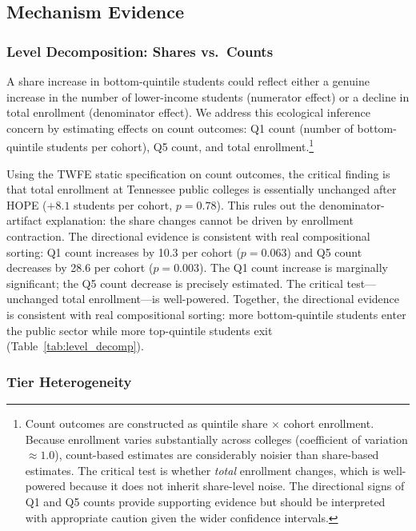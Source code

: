 \subsection{Mechanism Evidence}
\label{sec:results_mechanisms}

\subsubsection{Level Decomposition: Shares vs.\ Counts}

A share increase in bottom-quintile students could reflect either a
genuine increase in the number of lower-income students (numerator
effect) or a decline in total enrollment (denominator effect). We
address this ecological inference concern by estimating effects on
count outcomes: Q1 count (number of bottom-quintile students per
cohort), Q5 count, and total enrollment.\footnote{Count outcomes are
constructed as quintile share $\times$ cohort enrollment. Because
enrollment varies substantially across colleges (coefficient of
variation $\approx 1.0$), count-based estimates are considerably
noisier than share-based estimates. The critical test is whether
\emph{total} enrollment changes, which is well-powered because it does
not inherit share-level noise. The directional signs of Q1 and Q5 counts
provide supporting evidence but should be interpreted with appropriate
caution given the wider confidence intervals.}

Using the TWFE static specification on count outcomes, the critical
finding is that total enrollment at Tennessee public colleges is
essentially unchanged after HOPE ($+8.1$ students per cohort,
$p = 0.78$). This rules out the denominator-artifact
explanation: the share changes cannot be driven by enrollment
contraction. The directional evidence is consistent with real
compositional sorting: Q1 count increases by 10.3 per cohort ($p =
0.063$) and Q5 count decreases by 28.6 per cohort ($p = 0.003$).
The Q1 count increase is marginally significant; the Q5 count
decrease is precisely estimated. The critical test---unchanged total
enrollment---is well-powered. Together, the directional evidence is
consistent with real compositional sorting: more bottom-quintile
students enter the public sector while more top-quintile students
exit (Table~\ref{tab:level_decomp}).

\subsubsection{Tier Heterogeneity}

